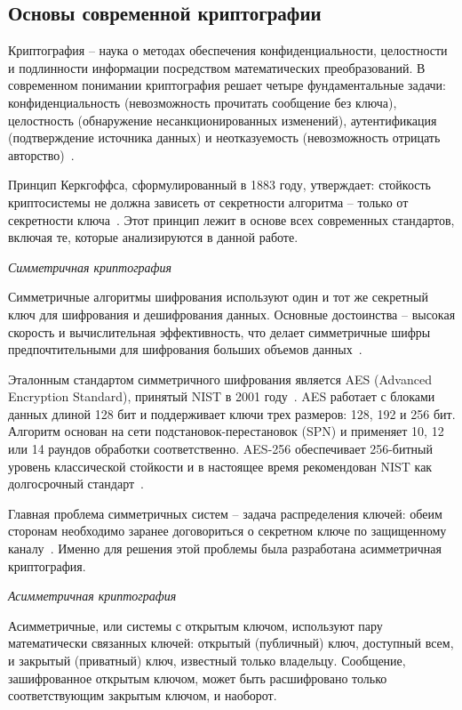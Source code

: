 \documentclass{itmo-vkr}
\begin{document}
	\subsection{Основы современной криптографии}
	
	
	Криптография -- наука о методах обеспечения конфиденциальности, целостности и подлинности информации посредством математических преобразований. В современном понимании криптография решает четыре фундаментальные задачи: конфиденциальность (невозможность прочитать сообщение без ключа), целостность (обнаружение несанкционированных изменений), аутентификация (подтверждение источника данных) и неотказуемость (невозможность отрицать авторство)~\cite{menezes1996handbook}.
	
	Принцип Керкгоффса, сформулированный в 1883 году, утверждает: стойкость криптосистемы не должна зависеть от секретности алгоритма -- только от секретности ключа~\cite{menezes1996handbook}. Этот принцип лежит в основе всех современных стандартов, включая те, которые анализируются в данной работе.
	
	\textit{Симметричная криптография}
	
	Симметричные алгоритмы шифрования используют один и тот же секретный ключ для шифрования и дешифрования данных. Основные достоинства -- высокая скорость и вычислительная эффективность, что делает симметричные шифры предпочтительными для шифрования больших объемов данных~\cite{stallings2022cryptography}.
	
	Эталонным стандартом симметричного шифрования является AES (Advanced Encryption Standard), принятый NIST в 2001 году~\cite{nist-fips197}. AES работает с блоками данных длиной 128 бит и поддерживает ключи трех размеров: 128, 192 и 256 бит. Алгоритм основан на сети подстановок-перестановок (SPN) и применяет 10, 12 или 14 раундов обработки соответственно. AES-256 обеспечивает 256-битный уровень классической стойкости и в настоящее время рекомендован NIST как долгосрочный стандарт~\cite{nist-ir8547}.
	
	Главная проблема симметричных систем -- задача распределения ключей: обеим сторонам необходимо заранее договориться о секретном ключе по защищенному каналу~\cite{diffie1976new}. Именно для решения этой проблемы была разработана асимметричная криптография.
	
	\textit{Асимметричная криптография}
	
	Асимметричные, или системы с открытым ключом, используют пару математически связанных ключей: открытый (публичный) ключ, доступный всем, и закрытый (приватный) ключ, известный только владельцу. Сообщение, зашифрованное открытым ключом, может быть расшифровано только соответствующим закрытым ключом, и наоборот.
	
\end{document}
